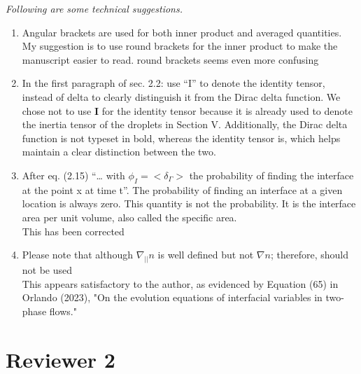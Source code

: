 \documentclass[10pt,a4paper]{article}
\newcommand{\tb}[1]{\color{blue}#1\color{black}}
\newcommand{\tr}[1]{\color{red}#1\color{black}}
\begin{document}
\textit{Following are some technical suggestions.}


\begin{enumerate}
    \item Angular brackets are used for both inner product and averaged quantities. My suggestion is to use round brackets for the inner product to make the manuscript easier to read.
    \tr{round brackets seems even more confusing}
    \item In the first paragraph of sec. 2.2: use “I” to denote the identity tensor, instead of delta to
    clearly distinguish it from the Dirac delta function.
    \tr{
        We chose not to use \textbf{I} for the identity tensor because it is already used to denote the inertia tensor of the droplets in Section V. 
        Additionally, the Dirac delta function is not typeset in bold, whereas the identity tensor is, which helps maintain a clear distinction between the two.
     }
    \item After eq. (2.15) “… with $\phi_I = <\delta_\Gamma>$ the probability of finding the interface at the point x at
    time t”. The probability of finding an interface at a given location is always zero. This
    quantity is not the probability. It is the interface area per unit volume, also called the specific
    area.\\
    \tb{This has been corrected}
    \item Please note that although $\nabla_{||} n$ is well defined but not $\nabla n$; therefore, should not be used
    \\
    \tr{This appears satisfactory to the author, as evidenced by Equation (65) in Orlando (2023), "On the evolution equations of interfacial variables in two-phase flows."}
\end{enumerate}


\section*{Reviewer 2}
\end{document}
